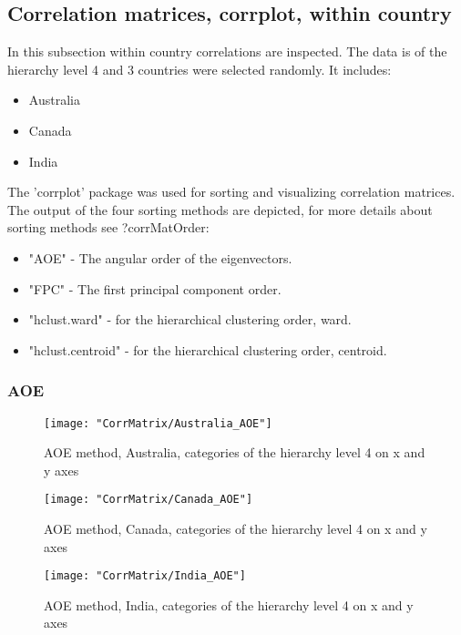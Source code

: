 \documentclass[a4paper]{article}
\begin{document}
\subsection{Correlation matrices, corrplot, within country}
In this subsection within country correlations are inspected. The data
is of the hierarchy level 4 and 3 countries were selected randomly. It
includes:

\begin{itemize}
\item Australia
\item Canada
\item India
\end{itemize}

The 'corrplot' package was used for sorting and visualizing
correlation matrices. The output of the four sorting methods are
depicted, for more details about sorting methods see ?corrMatOrder:

\begin{itemize}
\item "AOE" -  The angular order of the eigenvectors.
\item "FPC" - The first principal component order.
\item "hclust.ward" - for the hierarchical clustering order, ward.
\item "hclust.centroid" - for the hierarchical clustering order, centroid.
\end{itemize}

\subsubsection{AOE}

\begin{figure}[H]
\begin{center}
\texttt{[image: "CorrMatrix/Australia\_AOE"]}
\caption{AOE method, Australia, categories of the hierarchy level 4 on x and y axes}
\label{fig:2}
\end{center}
\end{figure}

\begin{figure}[H]
\begin{center}
\texttt{[image: "CorrMatrix/Canada\_AOE"]}
\caption{AOE method, Canada, categories of the hierarchy level 4 on x and y axes}
\label{fig:2}
\end{center}
\end{figure}

\begin{figure}[H]
\begin{center}
\texttt{[image: "CorrMatrix/India\_AOE"]}
\caption{AOE method, India, categories of the hierarchy level 4 on x and y axes}
\label{fig:2}
\end{center}
\end{figure}
\end{document}
